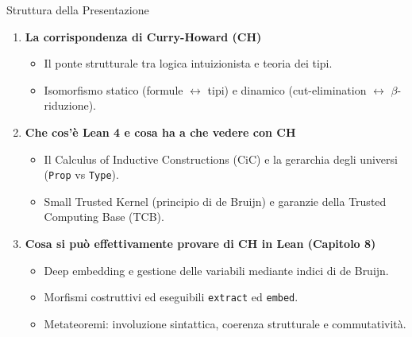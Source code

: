 \begin{frame}{Struttura della Presentazione}
    \begin{enumerate}
        \item \textbf{La corrispondenza di Curry-Howard (CH)}
        \begin{itemize}
            \item Il ponte strutturale tra logica intuizionista e teoria dei tipi.
            \item Isomorfismo statico (formule $\leftrightarrow$ tipi) e dinamico (cut-elimination $\leftrightarrow$ $\beta$-riduzione).
        \end{itemize}
        
        \item \textbf{Che cos'è Lean 4 e cosa ha a che vedere con CH}
        \begin{itemize}
            \item Il Calculus of Inductive Constructions (CiC) e la gerarchia degli universi (\texttt{Prop} vs \texttt{Type}).
            \item Small Trusted Kernel (principio di de Bruijn) e garanzie della Trusted Computing Base (TCB).
        \end{itemize}
        
        \item \textbf{Cosa si può effettivamente provare di CH in Lean (Capitolo 8)}
        \begin{itemize}
            \item Deep embedding e gestione delle variabili mediante indici di de Bruijn.
            \item Morfismi costruttivi ed eseguibili \texttt{extract} ed \texttt{embed}.
            \item Metateoremi: involuzione sintattica, coerenza strutturale e commutatività.
        \end{itemize}
    \end{enumerate}
\end{frame}